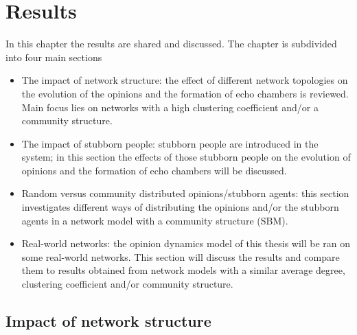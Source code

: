 \documentclass[11 pt , letterpaper , twoside , openright]{book}
\begin{document}
\chapter{Results}

In this chapter the results are shared and discussed. The chapter is subdivided into four main sections
\begin{itemize}
	\item The impact of network structure: the effect of different network topologies on the evolution of the opinions and the formation of echo chambers is reviewed. Main focus lies on networks with a high clustering coefficient and/or a community structure.
	\item The impact of stubborn people: stubborn people are introduced in the system; in this section the effects of those stubborn people on the evolution of opinions and the formation of echo chambers will be discussed.
	\item Random versus community distributed opinions/stubborn agents: this section investigates different ways of distributing the opinions and/or the stubborn agents in a network model with a community structure (SBM).
	\item Real-world networks: the opinion dynamics model of this thesis will be ran on some real-world networks. This section will discuss the results and compare them to results obtained from network models with a similar average degree, clustering coefficient and/or community structure.
\end{itemize}

\section{Impact of network structure}\label{netw_struc}
\end{document}
